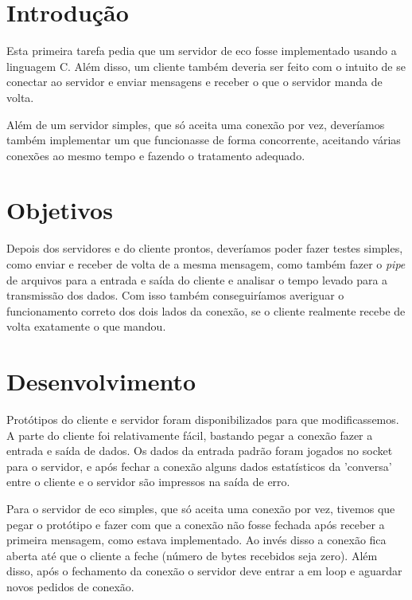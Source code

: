 \documentclass[12pt,a4paper]{article}
\begin{document}


\tableofcontents

\section{Introdução}

Esta primeira tarefa pedia que um servidor de eco fosse implementado
usando a linguagem C. Além disso, um cliente também deveria ser feito
com o intuito de se conectar ao servidor e enviar mensagens e receber
o que o servidor manda de volta.

Além de um servidor simples, que só aceita uma conexão por vez,
deveríamos também implementar um que funcionasse de forma concorrente,
aceitando várias conexões ao mesmo tempo e fazendo o tratamento adequado.

\section{Objetivos}

Depois dos servidores e do cliente prontos, deveríamos poder fazer
testes simples, como enviar e receber de volta de a mesma mensagem,
como também fazer o \textit{pipe} de arquivos para a entrada e saída
do cliente e analisar o tempo levado para a transmissão dos dados. Com
isso também conseguiríamos averiguar o funcionamento correto dos dois
lados da conexão, se o cliente realmente recebe de volta exatamente o
que mandou.

\section{Desenvolvimento}

Protótipos do cliente e servidor foram disponibilizados para que
modificassemos. A parte do cliente foi relativamente fácil, bastando
pegar a conexão fazer a entrada e saída de dados. Os dados da entrada
padrão foram jogados no socket para o servidor, e após fechar a
conexão alguns dados estatísticos da 'conversa' entre o cliente e o
servidor são impressos na saída de erro. 

Para o servidor de eco simples, que só aceita uma conexão por vez,
tivemos que pegar o protótipo e fazer com que a conexão não fosse
fechada após receber a primeira mensagem, como estava implementado. Ao
invés disso a conexão fica aberta até que o cliente a feche (número de
bytes recebidos seja zero). Além disso, após o fechamento da conexão o
servidor deve entrar a em loop e aguardar novos pedidos de conexão. 
\end{document}
